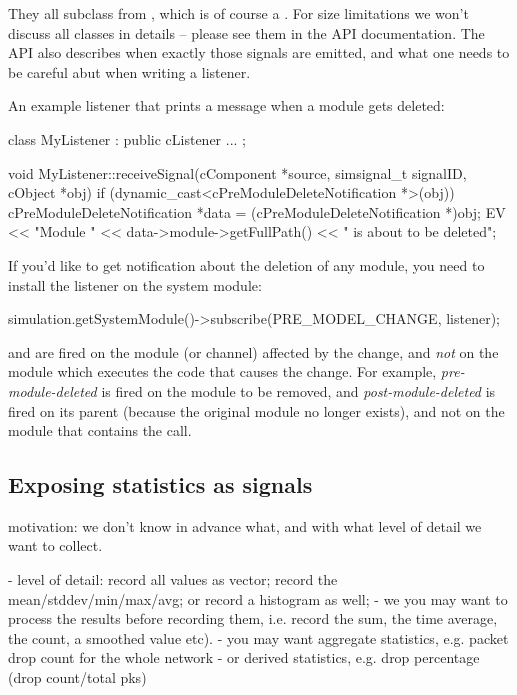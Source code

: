 \begin{note}
\begin{note}
They all subclass from , which is of course a
. For size limitations we won't discuss all classes in details --
please see them in the API documentation. The API also describes when exactly
those signals are emitted, and what one needs to be careful abut when writing
a listener.

An example listener that prints a message when a module gets deleted:

\begin{cpp}
class MyListener : public cListener
{
   ...
};

void MyListener::receiveSignal(cComponent *source, simsignal_t signalID, cObject *obj)
{
    if (dynamic_cast<cPreModuleDeleteNotification *>(obj))
    {
        cPreModuleDeleteNotification *data = (cPreModuleDeleteNotification *)obj;
        EV << "Module " << data->module->getFullPath() << " is about to be deleted\n";
    }
}
\end{cpp}

If you'd like to get notification about the deletion of any module, you need
to install the listener on the system module:

\begin{cpp}
simulation.getSystemModule()->subscribe(PRE_MODEL_CHANGE, listener);
\end{cpp}

\begin{note}
   and  are fired on the
  module (or channel) affected by the change, and \textit{not} on the module
  which executes the code that causes the change. For example,
  \textit{pre-module-deleted} is fired on the module to be removed, and
  \textit{post-module-deleted} is fired on its parent (because the original
  module no longer exists), and not on the module that contains the
   call.
\end{note}



\subsection{Exposing statistics as signals}

motivation: we don't know in advance what, and with what level of detail we want to collect.

- level of detail: record all values as vector; record the mean/stddev/min/max/avg;
  or record a histogram as well;
- we you may want to process the results before recording them, i.e. record the sum,
  the time average, the count, a smoothed value etc).
- you may want aggregate statistics, e.g. packet drop count for the whole network
- or derived statistics, e.g. drop percentage (drop count/total pks)


\end{note}
\end{note}
